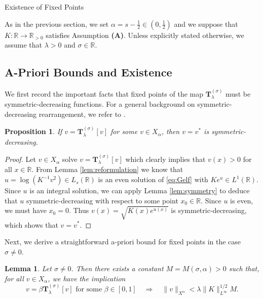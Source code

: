 \documentclass[reqno,10pt,a4paper]{amsart}
\makeatletter
\newtheorem{lem}{Lemma}[section]
\newtheorem{prop}{Proposition}[section]
\theoremstyle{definition}
\theoremstyle{definition}
\theoremstyle{remark}
\theoremstyle{remark}
\numberwithin{equation}{section}
\newcommand{\R}{\mathbb{R}}
\newcommand{\Tss}{\mathbf{T}^{(\sigma)}_\lambda}
\def\section{\@startsection{section}{1}%
  \z@{1.5\linespacing\@plus\linespacing}{.5\linespacing}%
  {\normalfont\bfseries\large\centering}}
\makeatother
\begin{document}

\section{Existence of Fixed Points} \label{sec:apriori}

As in the previous section, we set $\alpha = s -\frac{1}{2} \in (0, \frac{1}{2})$ and we suppose that $K : \R \to \R_{>0}$ satisfies Assumption \textbf{(A)}. Unless explicitly stated otherwise, we assume that $\lambda > 0$ and $\sigma \in \R$.

\subsection{A-Priori Bounds and Existence}
We first record the important facts that fixed points of the map $\Tss$ must be symmetric-decreasing functions. For a general background on symmetric-decreasing rearrangement, we refer to \cite{LiLo-01}. 

\begin{prop}
If $v = \Tss[v]$ for some $v \in X_\alpha$, then $v=v^*$ is symmetric-decreasing.
\end{prop}

\begin{proof}
Let $v \in X_\alpha$ solve $v = \Tss[v]$ which clearly implies that $v(x) > 0$ for all $x \in \R$. From Lemma \ref{lem:reformulation} we know that $u=\log(K^{-1} v^2) \in L_s(\R)$ is an even solution of \eqref{eq:Gelf} with $K e^u \in L^1(\R)$. Since $u$ is an integral solution, we can apply Lemma \ref{lem:symmetry}  to deduce that $u$ symmetric-decreasing with respect to some point $x_0 \in \R$. Since $u$ is even, we must have $x_0=0$. Thus $v(x) = \sqrt{K(x) e^{u(x)}}$ is symmetric-decreasing, which shows that $v=v^*$. 
\end{proof}

Next, we derive a straightforward a-priori bound for fixed points in the case $\sigma \neq 0$.

\begin{lem} \label{lem:apriori_easy}
Let $\sigma \neq 0$. Then there exists a constant $M=M(\sigma, \alpha) >0$ such that, for all $v \in X_\alpha$, we have the implication
$$
\mbox{$v = \beta \Tss[v]$ for some $\beta \in [0,1]$} \quad \Rightarrow \quad \|v \|_{X^\alpha} < \lambda \|K \|_{L^\infty}^{1/2}  M . 
$$
\end{lem}
\end{document}
